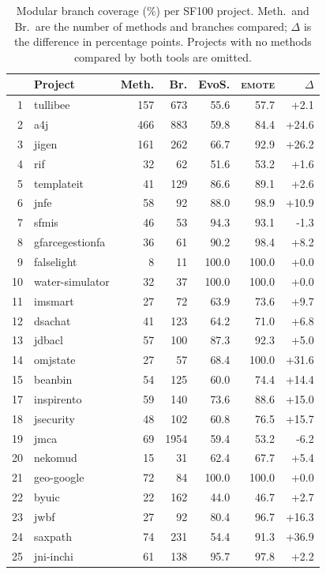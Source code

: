 \begin{table}[p]
\centering
\scriptsize
\caption{Modular branch coverage (\%) per SF100 project. Meth.\ and Br.\ are the number of methods and branches compared; $\Delta$ is the difference in percentage points. Projects with no methods compared by both tools are omitted.}
\label{tab:appendix}
\begin{tabular}[t]{rlrrrrr}
\toprule
 & Project & Meth. & Br. & EvoS. & \textsc{emote} & $\Delta$ \\
\midrule
1 & tullibee & 157 & 673 & 55.6 & 57.7 & +2.1 \\
2 & a4j & 466 & 883 & 59.8 & 84.4 & +24.6 \\
3 & jigen & 161 & 262 & 66.7 & 92.9 & +26.2 \\
4 & rif & 32 & 62 & 51.6 & 53.2 & +1.6 \\
5 & templateit & 41 & 129 & 86.6 & 89.1 & +2.6 \\
6 & jnfe & 58 & 92 & 88.0 & 98.9 & +10.9 \\
7 & sfmis & 46 & 53 & 94.3 & 93.1 & -1.3 \\
8 & gfarcegestionfa & 36 & 61 & 90.2 & 98.4 & +8.2 \\
9 & falselight & 8 & 11 & 100.0 & 100.0 & +0.0 \\
10 & water-simulator & 32 & 37 & 100.0 & 100.0 & +0.0 \\
11 & imsmart & 27 & 72 & 63.9 & 73.6 & +9.7 \\
12 & dsachat & 41 & 123 & 64.2 & 71.0 & +6.8 \\
13 & jdbacl & 57 & 100 & 87.3 & 92.3 & +5.0 \\
14 & omjstate & 27 & 57 & 68.4 & 100.0 & +31.6 \\
15 & beanbin & 54 & 125 & 60.0 & 74.4 & +14.4 \\
17 & inspirento & 59 & 140 & 73.6 & 88.6 & +15.0 \\
18 & jsecurity & 48 & 102 & 60.8 & 76.5 & +15.7 \\
19 & jmca & 69 & 1954 & 59.4 & 53.2 & -6.2 \\
20 & nekomud & 15 & 31 & 62.4 & 67.7 & +5.4 \\
21 & geo-google & 72 & 84 & 100.0 & 100.0 & +0.0 \\
22 & byuic & 22 & 162 & 44.0 & 46.7 & +2.7 \\
23 & jwbf & 27 & 92 & 80.4 & 96.7 & +16.3 \\
24 & saxpath & 74 & 231 & 54.4 & 91.3 & +36.9 \\
25 & jni-inchi & 61 & 138 & 95.7 & 97.8 & +2.2 \\

\end{tabular}
\end{table}

